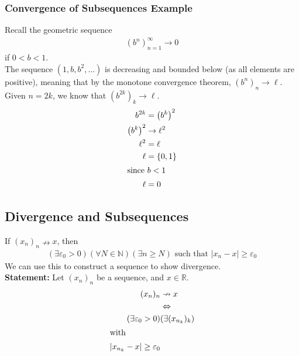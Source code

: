 \documentclass[10pt]{extarticle}
\newcommand{\N}{\mathbb{N}}
\newcommand{\R}{\mathbb{R}}
\begin{document}
    \subsubsection{Convergence of Subsequences Example}%
      Recall the geometric sequence
      \begin{align*}
        (b^n)_{n=1}^{\infty} \rightarrow 0
      \end{align*}
      if $0 < b < 1$.\\

      The sequence $(1,b,b^2,\dots)$ is decreasing and bounded below (as all elements are positive), meaning that by the monotone convergence theorem, $(b^n)_{n} \rightarrow \ell$.\\

      Given $n = 2k$, we know that $(b^{2k})_k \rightarrow \ell$.
      \begin{align*}
        b^{2k} &= \left(b^k\right)^2\\
        \left(b^k\right)^2 &\rightarrow \ell^2\\
        \ell^2 &= \ell\\
        \ell &= \{0,1\}\\
        \shortintertext{since $b < 1$}
        \ell &= 0
      \end{align*}
  \subsection{Divergence and Subsequences}%
    If $(x_n)_n \nrightarrow x$, then
    \begin{align*}
      \left(\exists \varepsilon_0> 0\right)\left(\forall N\in\N\right)\left(\exists n\geq N\right) \text{ such that } |x_n-x| \geq \varepsilon_0
    \end{align*}
    We can use this to construct a sequence to show divergence.\\

    \textbf{Statement:} Let $(x_n)_n$ be a sequence, and $x\in\R$.
    \begin{align*}
      (x_n)_n &\nrightarrow x \\
              &\Leftrightarrow\\
      (\exists \varepsilon_0>0)&(\exists (x_{n_k})_k)\\
      \shortintertext{with}
      |x_{n_k} - x| \geq \varepsilon_0
    \end{align*}
\end{document}
